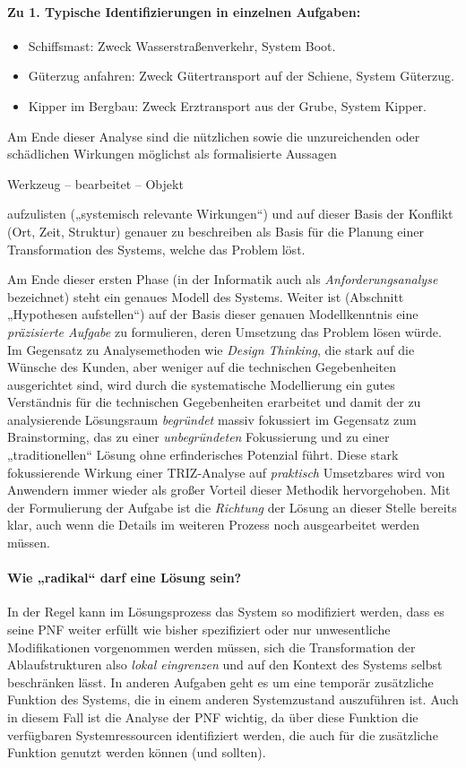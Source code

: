 \documentclass[11pt,a4paper]{article}
\begin{document}
\paragraph{Zu 1. Typische Identifizierungen in einzelnen Aufgaben:}
\begin{itemize}[noitemsep]
\item Schiffsmast: Zweck Wasserstraßenverkehr, System Boot.
\item Güterzug anfahren: Zweck Gütertransport auf der Schiene, System
  Güterzug. 
\item Kipper im Bergbau: Zweck Erztransport aus der Grube, System
  Kipper. 
\end{itemize}

Am Ende dieser Analyse sind die nützlichen sowie die unzureichenden oder
schädlichen Wirkungen möglichst als formalisierte Aussagen
\begin{center}
  Werkzeug -- bearbeitet -- Objekt
\end{center}
aufzulisten („systemisch relevante Wirkungen“) und auf dieser Basis der
Konflikt (Ort, Zeit, Struktur) genauer zu beschreiben als Basis für die
Planung einer Transformation des Systems, welche das Problem löst. 

Am Ende dieser ersten Phase (in der Informatik auch als
\emph{Anforderungsanalyse} bezeichnet) steht ein genaues Modell des Systems.
Weiter ist (Abschnitt „Hypothesen aufstellen“) auf der Basis dieser genauen
Modellkenntnis eine \emph{präzisierte Aufgabe} zu formulieren, deren Umsetzung
das Problem lösen würde. Im Gegensatz zu Analysemethoden wie \emph{Design
  Thinking}, die stark auf die Wünsche des Kunden, aber weniger auf die
technischen Gegebenheiten ausgerichtet sind, wird durch die systematische
Modellierung ein gutes Verständnis für die technischen Gegebenheiten
erarbeitet und damit der zu analysierende Lösungsraum \emph{begründet} massiv
fokussiert im Gegensatz zum Brainstorming, das zu einer \emph{unbegründeten}
Fokussierung und zu einer „traditionellen“ Lösung ohne erfinderisches
Potenzial führt.  Diese stark fokussierende Wirkung einer TRIZ-Analyse auf
\emph{praktisch} Umsetzbares wird von Anwendern immer wieder als großer
Vorteil dieser Methodik hervorgehoben.  Mit der Formulierung der Aufgabe ist
die \emph{Richtung} der Lösung an dieser Stelle bereits klar, auch wenn die
Details im weiteren Prozess noch ausgearbeitet werden müssen.

\paragraph{Wie „radikal“ darf eine Lösung sein?}
In der Regel kann im Lösungsprozess das System so modifiziert werden, dass es
seine PNF weiter erfüllt wie bisher spezifiziert oder nur unwesentliche
Modifikationen vorgenommen werden müssen, sich die Transformation der
Ablaufstrukturen also \emph{lokal eingrenzen} und auf den Kontext des Systems
selbst beschränken lässt.  In anderen Aufgaben geht es um eine temporär
zusätzliche Funktion des Systems, die in einem anderen Systemzustand
auszuführen ist. Auch in diesem Fall ist die Analyse der PNF wichtig, da über
diese Funktion die verfügbaren Systemressourcen identifiziert werden, die auch
für die zusätzliche Funktion genutzt werden können (und sollten).
\end{document}
